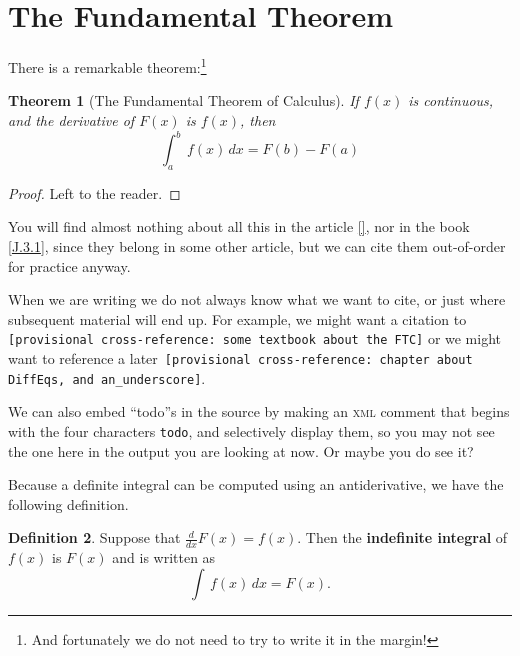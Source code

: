 \documentclass{amsart}
\theoremstyle{plain}%
\newtheorem{theorem}{Theorem}[section]
\theoremstyle{definition}%
\newtheorem{definition}[theorem]{Definition}
\theoremstyle{remark}%
\newcommand{\xreffont}{\relax}
\newcommand{\mono}[1]{\texttt{#1}}
\newcommand{\initialism}[1]{\textsc{\MakeLowercase{#1}}}
\newcommand{\terminology}[1]{\textbf{#1}}
\numberwithin{equation}{section}
\newcommand{\definiteintegral}[4]{\int_{#1}^{#2}\,#3\,d#4}
\begin{document}
\section{The Fundamental Theorem}\label{section-fundamental-theorem}%
There is a remarkable theorem:\footnote{And fortunately we do not need to try to write it in the margin!\label{footnote-fermat}}%
\begin{theorem}[The Fundamental Theorem of Calculus]\label{theorem-FTC}%
%
%
If \(f(x)\) is continuous, and the derivative of \(F(x)\) is \(f(x)\), then%
\begin{equation*}
\definiteintegral{a}{b}{f(x)}{x}=F(b)-F(a)
\end{equation*}
%
\end{theorem}
\begin{proof}\label{theorem-FTC-4}%
Left to the reader.%
\end{proof}
You will find almost nothing about all this in the article \hyperlink{biblio-lay-article}{[{\xreffont 2}]}, nor in the book \hyperlink{biblio-judson-AATA}{[{\xreffont J.3.1}]}, since they belong in some other article, but we can cite them out-of-order for practice anyway.%
\par
When we are writing we do not always know what we want to cite, or just where subsequent material will end up.  For example, we might want a citation to \mono{[provisional cross-reference: some textbook about the FTC]} or we might want to reference a later~\mono{[provisional cross-reference: chapter about DiffEq\textquotesingle{}s, and an\_underscore]}.%
\par
We can also embed ``todo''s in the source by making an \initialism{XML} comment that begins with the four characters \mono{todo}, and selectively display them, so you may not see the one here in the output you are looking at now.  Or maybe you do see it?%
\par
Because a definite integral can be computed using an antiderivative, we have the following definition.%
\begin{definition}\label{definition-indefinite-integral}%
%
%
%
\label{definition-indefinite-integral-3}%
Suppose that \(\frac{d}{dx}F(x)=f(x)\).  Then the \terminology{indefinite integral} of \(f(x)\) is \(F(x)\) and is written as%
\begin{equation*}
\int\,f(x)\,dx=F(x)\text{.}
\end{equation*}
%
\end{definition}
%
%
\typeout{************************************************}
\typeout{************************************************}
%
\end{document}
